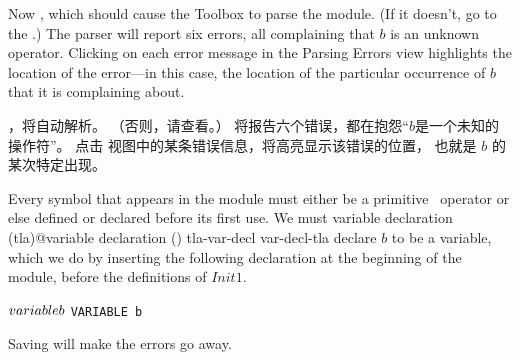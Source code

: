 \begin{en}
Now , which should cause the
Toolbox to parse the module.  (If it doesn't, go to the
.)  The
parser will report six errors, all complaining that $b$ is an unknown
operator.  Clicking on each error message in the \textsf{Parsing
Errors} view highlights the location of the error---in this case, the
location of the particular occurrence of $b$ that it is complaining
about.
\end{en}

\begin{ch}
  ，\tlatoolbox{}将自动解析。
  （否则，请查看。）
  \tlaparser{}将报告六个错误，都在抱怨``$b$是一个未知的操作符''。
  点击\textsf{\tlaparsererror} 视图中的某条错误信息，将高亮显示该错误的位置，
  也就是 $b$ 的某次特定出现。
\end{ch}

\begin{en}
Every symbol that appears in the module must either be a
primitive \tlaplus\ operator or else defined or declared before its
first use.  We must 
   {variable declaration (tla)@variable declaration ()}%
   {tla-var-decl}%
   {var-decl-tla}%
declare $b$ to be a variable, which we do by
inserting the following declaration at the beginning of the module,
before the definitions of $Init1$.%
\begin{display}
\begin{twocols}
$\VARIABLE b$ %
\midcol \verb|VARIABLE b|
\end{twocols}
\end{display}
Saving 
will make the errors go away.
\end{en}

